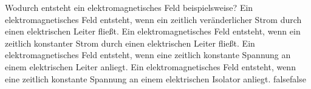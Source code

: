     {Wodurch entsteht ein elektromagnetisches Feld beispielsweise?}
    {Ein elektromagnetisches Feld entsteht, wenn ein zeitlich veränderlicher Strom durch einen elektrischen Leiter fließt.}
    {Ein elektromagnetisches Feld entsteht, wenn ein zeitlich konstanter Strom durch einen elektrischen Leiter fließt.}
    {Ein elektromagnetisches Feld entsteht, wenn eine zeitlich konstante Spannung an einem elektrischen Leiter anliegt.}
    {Ein elektromagnetisches Feld entsteht, wenn eine zeitlich konstante Spannung an einem elektrischen Isolator anliegt.}
    {false}{false}